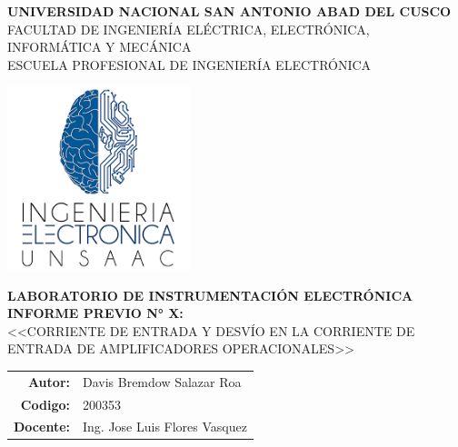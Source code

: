 \begin{titlepage}

  \begin{center}
    \Large{\textbf{UNIVERSIDAD NACIONAL SAN ANTONIO ABAD DEL CUSCO}} \\ 
    \vspace{0.4cm}
    \large{FACULTAD DE INGENIER\'IA EL\'ECTRICA, ELECTR\'ONICA, INFORM\'ATICA Y MEC\'ANICA}\ \\ 
    \vspace{0.1cm} 
    \large{ESCUELA PROFESIONAL DE INGENIER\'IA ELECTR\'ONICA}\ \\ 
	
    \vspace{1.0cm}    
    
    \includegraphics[width=0.4\textwidth]{images/LI-UNSAAC.png} \\


    \vspace{0.8cm}

    \large{\textbf{\textsc{LABORATORIO DE INSTRUMENTACIÓN ELECTR\'ONICA}}} \\
    \vspace{0.2cm}
    \large{\textbf{\textsc{INFORME PREVIO N° X:}}} \\ 
    
    
    \vspace{0.5cm}
    \large{ \textsc{<<CORRIENTE DE ENTRADA Y DESVÍO EN LA CORRIENTE DE ENTRADA DE AMPLIFICADORES OPERACIONALES>>}} \\
    \vspace{1.0cm}
    
    \begin{table}[H]
    	\centering
    	\begin{tabular}{rl}
    		\large{\textbf{Autor:}}   & \large{Davis Bremdow Salazar Roa}  \\
    		\large{\textbf{Codigo:}}   & \large{200353}  \\
    		\large{\textbf{Docente:}} & \large{Ing. Jose Luis Flores Vasquez}
    	\end{tabular}
    \end{table}


\end{center}
\end{titlepage}
